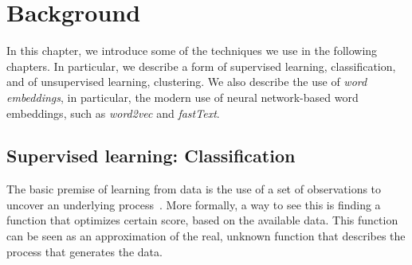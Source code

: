 \chapter{Background}

In this chapter, we introduce some of the techniques we use in the following
chapters. 
%
In particular, we describe a form of supervised learning, classification, and of
unsupervised learning, clustering.
%
We also describe the use of {\em word embeddings}, in particular, the modern use
of neural network-based word embeddings, such as {\em word2vec} and {\em
fastText}.


\section{Supervised learning: Classification}

The basic premise of learning from data is the use of a set of observations to
uncover an underlying process~\cite{Abu-Mostafa:2012:LD:2207825}. 
%
More formally, a way to see this is finding a function that optimizes certain
score, based on the available data. 
%
This function can be seen as an approximation of the real, unknown function
that describes the process that generates the data.


